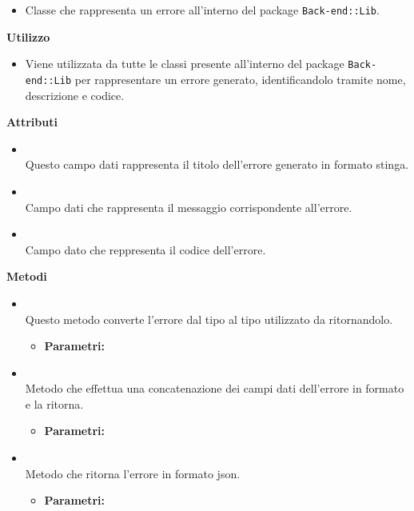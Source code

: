 					\begin{itemize}
						\item[] Classe che rappresenta un errore all'interno del package \texttt{Back-end::Lib}.
					\end{itemize}      
				\textbf{Utilizzo}  
					\begin{itemize}
						\item[] Viene utilizzata da tutte le classi presente all'interno del package \texttt{Back-end::Lib} per rappresentare un errore generato, identificandolo tramite nome, descrizione e codice.
					\end{itemize}
			 \textbf{Attributi} 
	\begin{itemize}
					\item[] \textbf{} \\ Questo campo dati rappresenta il titolo dell'errore generato in formato stinga.
					\item[] \textbf{} \\ Campo dati che rappresenta il messaggio corrispondente all'errore.
					\item[] \textbf{} \\ Campo dato che reppresenta il codice dell'errore.
		\end{itemize}
		
		\textbf{Metodi} 
	\begin{itemize}
					\item[] \textbf{} \\ Questo metodo converte l'errore dal tipo  al tipo  utilizzato da  ritornandolo.
						\begin{itemize}\addtolength{\itemsep}{-0.5\baselineskip}
						\item[] \textbf{Parametri:}
				\end{itemize}
					\item[] \textbf{} \\ Metodo che effettua una concatenazione dei campi dati dell'errore in formato  e la ritorna.
						\begin{itemize}\addtolength{\itemsep}{-0.5\baselineskip}
						\item[] \textbf{Parametri:}
				\end{itemize}
					\item[] \textbf{} \\ Metodo che ritorna l'errore in formato json.
						\begin{itemize}\addtolength{\itemsep}{-0.5\baselineskip}
						\item[] \textbf{Parametri:}
				\end{itemize}
		\end{itemize}